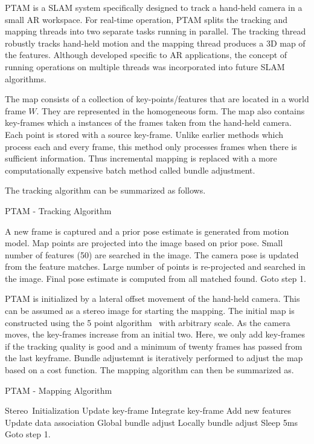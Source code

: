 PTAM is a SLAM system specifically designed to track a hand-held camera in a small AR workspace. For real-time operation, PTAM splits the tracking and mapping threads into two separate tasks running in parallel. The tracking thread robustly tracks hand-held motion and the mapping thread produces a 3D map of the features. Although developed specific to AR applications, the concept of running operations on multiple threads was incorporated into future SLAM algorithms. 

The map consists of a collection of key-points/features that are located in a world frame $W$. They are represented in the homogeneous form. The map also contains key-frames which a instances of the frames taken from the hand-held camera. Each point is stored with a source key-frame. Unlike earlier methods which process each and every frame, this method only processes frames when there is sufficient information. Thus incremental mapping is replaced with a more computationally expensive batch method called bundle adjustment. 

The tracking algorithm can be summarized as follows.

\begin{algorithm}
    \caption{PTAM - Tracking Algorithm}
    \begin{algorithmic}[1]
		\STATE A new frame is captured and a prior pose estimate is generated from motion model.
    	\STATE Map points are projected into the image based on prior pose. 
    	\STATE Small number of features (50) are searched in the image.
    	\STATE The camera pose is updated from the feature matches.
    	\STATE Large number of points is re-projected and searched in the image.
    	\STATE Final pose estimate is computed from all matched found. 
    	\STATE Goto step 1.
    \end{algorithmic}
\end{algorithm}

PTAM is initialized by a lateral offset movement of the hand-held camera. This can be assumed as a stereo image for starting the mapping. The initial map is constructed using the 5 point algorithm~\cite{nister2004efficient} with arbitrary scale. As the camera moves, the key-frames increase from an initial two. Here, we only add key-frames if the tracking quality is good and a minimum of twenty frames has passed from the last keyframe. Bundle adjustemnt is iteratively performed to adjust the map based on a cost function. The mapping algorithm can then be summarized as.

\begin{algorithm}
    \caption{PTAM - Mapping Algorithm}
	\begin{algorithmic}[1]
		\REQUIRE \mbox{Stereo Initialization}
			\STATE Update key-frame
			\STATE Integrate key-frame
			\STATE Add new features
				\STATE Update data association
			\ELSE
				\STATE Global bundle adjust
			\ENDIF
		\ELSE
			\STATE Locally bundle adjust
		\ENDIF
		\STATE Sleep 5ms
		\STATE Goto step 1.
	\end{algorithmic}
\end{algorithm}

